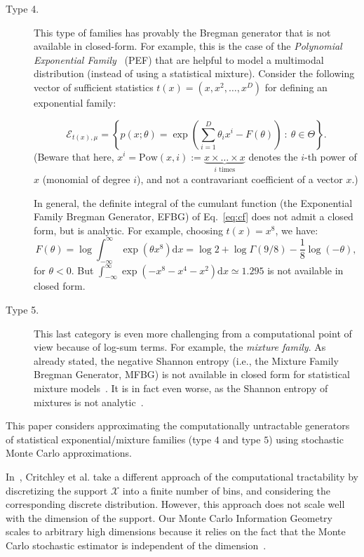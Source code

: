 \documentclass[graybox]{svmult}
\def\dx{\mathrm{d}x}
\def\eqdef{:=}
\def\calE{\mathcal{E}}
\def\calX{\mathcal{X}}
\def\st{{\ :\ }}
\begin{document}
\begin{description}
\item[Type 4.] This type of families has provably the Bregman generator that is not available in closed-form.
For example, this is the case of
the {\em Polynomial Exponential Family}~\cite{Cobb-1983,PEF-2016} (PEF) that are helpful to model a multimodal distribution (instead of using a statistical mixture).
Consider the following vector of sufficient statistics $t(x)=(x,x^2,\ldots, x^D)$ for defining an exponential family:

\begin{equation}
\calE_{t(x),\mu}=\left\{ p(x;\theta)=\exp\left(\sum_{i=1}^D \theta_i x^i-F(\theta)\right) \st \theta\in\Theta\right\}.
\end{equation}
(Beware that here, $x^i=\mathrm{Pow}(x,i)\eqdef \underbrace{x\times\ldots\times x}_{\mbox{$i$ times}}$ denotes the $i$-th power of $x$ (monomial of degree $i$), and not a contravariant coefficient of a vector $x$.)
 
In general, the definite integral of the cumulant function (the Exponential Family Bregman Generator, EFBG) of Eq.~\ref{eq:cf} does not admit a closed form, but is analytic.
For example, choosing $t(x)=x^8$, we have:
\begin{equation}
F(\theta)=\log \int_{-\infty}^\infty \exp(\theta x^8) \dx = \log 2+\log \Gamma(9/8)-\frac{1}{8}\log(-\theta),
\end{equation}
for $\theta<0$.
But $\int_{-\infty}^\infty \exp(-x^8-x^4-x^2) \dx \simeq 1.295$ is not available in closed form.


 

\item[Type 5.] This last category is even more challenging from a computational point of view because of log-sum terms.
For example, the {\em mixture family}.
As already stated, the negative Shannon entropy (i.e., the Mixture Family Bregman Generator, MFBG) is not available in closed form for statistical mixture models~\cite{wmixture-2017}.
It is in fact even worse, as the Shannon entropy of mixtures is not analytic~\cite{KLnotanalytic-2004}.

\end{description}


This paper considers approximating the computationally untractable generators of statistical exponential/mixture families (type $4$ and type $5$) using stochastic Monte Carlo approximations.

In~\cite{Critchley-CIG}, Critchley et al. take a different approach of the computational tractability by discretizing the support $\calX$ into a finite number of bins, and considering the corresponding discrete distribution. However, this approach does not scale well with the dimension of the support. Our Monte Carlo Information Geometry scales to arbitrary high dimensions because it relies on the fact that the Monte Carlo stochastic estimator is independent of the dimension~\cite{MC-2014}.
\end{document}
